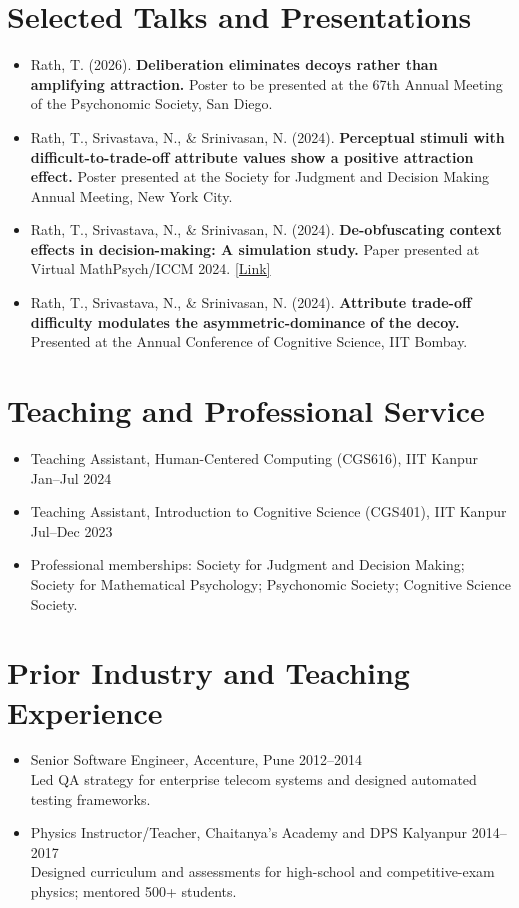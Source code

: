 \documentclass[10pt, a4paper]{extarticle}
\newcommand{\sectiontight}[1]{\vspace{6pt}\section{#1}}
\begin{document}
\sectiontight{Selected Talks and Presentations}
\begin{itemize}
  \item Rath, T. (2026). \textbf{Deliberation eliminates decoys rather than amplifying attraction.} Poster to be presented at the 67th Annual Meeting of the Psychonomic Society, San Diego.
  \item Rath, T., Srivastava, N., \& Srinivasan, N. (2024). \textbf{Perceptual stimuli with difficult-to-trade-off attribute values show a positive attraction effect.} Poster presented at the Society for Judgment and Decision Making Annual Meeting, New York City.
  \item Rath, T., Srivastava, N., \& Srinivasan, N. (2024). \textbf{De-obfuscating context effects in decision-making: A simulation study.} Paper presented at Virtual MathPsych/ICCM 2024. \href{https://mathpsych.org/presentation/1357}{[Link]}
  \item Rath, T., Srivastava, N., \& Srinivasan, N. (2024). \textbf{Attribute trade-off difficulty modulates the asymmetric-dominance of the decoy.} Presented at the Annual Conference of Cognitive Science, IIT Bombay.
\end{itemize}

\sectiontight{Teaching and Professional Service}
\begin{itemize}
  \item Teaching Assistant, Human-Centered Computing (CGS616), IIT Kanpur \hfill Jan--Jul 2024
  \item Teaching Assistant, Introduction to Cognitive Science (CGS401), IIT Kanpur \hfill Jul--Dec 2023
  \item Professional memberships: Society for Judgment and Decision Making; Society for Mathematical Psychology; Psychonomic Society; Cognitive Science Society.
\end{itemize}

\sectiontight{Prior Industry and Teaching Experience}
\begin{itemize}
  \item Senior Software Engineer, Accenture, Pune \hfill 2012--2014\\
  Led QA strategy for enterprise telecom systems and designed automated testing frameworks.
  \item Physics Instructor/Teacher, Chaitanya's Academy and DPS Kalyanpur \hfill 2014--2017\\
  Designed curriculum and assessments for high-school and competitive-exam physics; mentored 500+ students.
\end{itemize}
\end{document}

